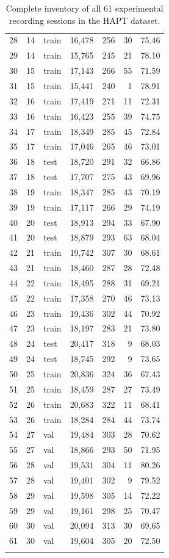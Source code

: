 \documentclass[11pt,a4paper]{article}
\theoremstyle{definition}
\begin{document}
\begin{longtable}{@{}rrlrrrr@{}}
28 & 14 & train & 16,478 & 256 & 30 & 75.46\\
29 & 14 & train & 15,765 & 245 & 21 & 78.10\\
30 & 15 & train & 17,143 & 266 & 55 & 71.59\\
31 & 15 & train & 15,441 & 240 & 1 & 78.91\\
32 & 16 & train & 17,419 & 271 & 11 & 72.31\\
33 & 16 & train & 16,423 & 255 & 39 & 74.75\\
34 & 17 & train & 18,349 & 285 & 45 & 72.84\\
35 & 17 & train & 17,046 & 265 & 46 & 73.01\\
36 & 18 & test & 18,720 & 291 & 32 & 66.86\\
37 & 18 & test & 17,707 & 275 & 43 & 69.96\\
38 & 19 & train & 18,347 & 285 & 43 & 70.19\\
39 & 19 & train & 17,117 & 266 & 29 & 74.19\\
40 & 20 & test & 18,913 & 294 & 33 & 67.90\\
41 & 20 & test & 18,879 & 293 & 63 & 68.04\\
42 & 21 & train & 19,742 & 307 & 30 & 68.61\\
43 & 21 & train & 18,460 & 287 & 28 & 72.48\\
44 & 22 & train & 18,495 & 288 & 31 & 69.21\\
45 & 22 & train & 17,358 & 270 & 46 & 73.13\\
46 & 23 & train & 19,436 & 302 & 44 & 70.92\\
47 & 23 & train & 18,197 & 283 & 21 & 73.80\\
48 & 24 & test & 20,417 & 318 & 9 & 68.03\\
49 & 24 & test & 18,745 & 292 & 9 & 73.65\\
50 & 25 & train & 20,836 & 324 & 36 & 67.43\\
51 & 25 & train & 18,459 & 287 & 27 & 73.49\\
52 & 26 & train & 20,683 & 322 & 11 & 68.41\\
53 & 26 & train & 18,284 & 284 & 44 & 73.74\\
54 & 27 & val & 19,484 & 303 & 28 & 70.62\\
55 & 27 & val & 18,866 & 293 & 50 & 71.95\\
56 & 28 & val & 19,531 & 304 & 11 & 80.26\\
57 & 28 & val & 19,401 & 302 & 9 & 79.52\\
58 & 29 & val & 19,598 & 305 & 14 & 72.22\\
59 & 29 & val & 19,161 & 298 & 25 & 70.47\\
60 & 30 & val & 20,094 & 313 & 30 & 69.65\\
61 & 30 & val & 19,604 & 305 & 20 & 72.50\\\bottomrule
\caption{Complete inventory of all 61 experimental recording sessions in the HAPT dataset.}\label{tab:recording_inventory}
\end{longtable}
\end{document}
